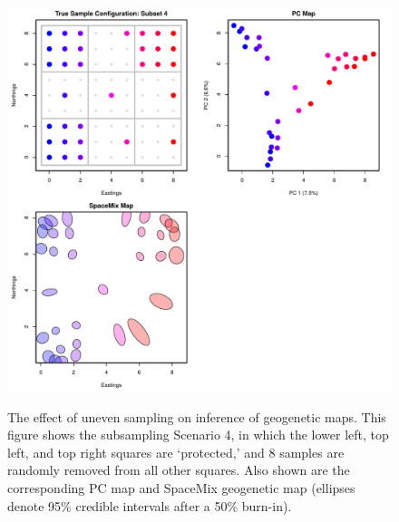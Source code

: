 \documentclass[10pt,letterpaper]{article}
\begin{document}
\begin{figure}
\centering
	{\includegraphics[width=\textwidth]{../figs/sims/grid_subsamp4.pdf}}
	\caption{The effect of uneven sampling on inference of geogenetic maps.  
			This figure shows the subsampling Scenario 4, 
			in which the lower left, top left, and top right squares are `protected,'
			and 8 samples are randomly removed from all other squares.
			Also shown are the corresponding PC map and 
			SpaceMix geogenetic map 
			(ellipses denote 95\% credible intervals after a 50\% burn-in).}\label{sfig:uneven_sampling_grid_subsamp4}
\end{figure}
\end{document}
